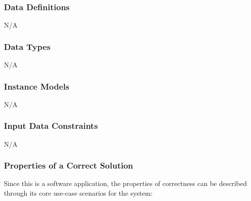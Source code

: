 \documentclass[12pt]{article}
\begin{document}
\subsubsection{Data Definitions}\label{sec_DataDefinitions} 
N/A

\subsubsection{Data Types}\label{sec_DataTypes}
N/A

\subsubsection{Instance Models} \label{sec_InstanceModels} 
N/A

\subsubsection{Input Data Constraints} \label{sec_InputDataConstraints}
N/A


\subsubsection{Properties of a Correct Solution} \label{sec_CorrectSolution}

Since this is a software application, the properties of correctness can be described through its core use-case scenarios for the system:
\end{document}
